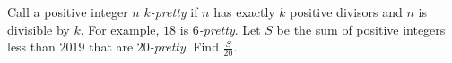 Call a positive integer $n$ $k$\emph{-pretty} if $n$ has exactly $k$ positive divisors and $n$ is divisible by $k$. For example, $18$ is $6$\emph{-pretty}. Let $S$ be the sum of positive integers less than $2019$ that are $20$\emph{-pretty}. Find $\tfrac{S}{20}$.